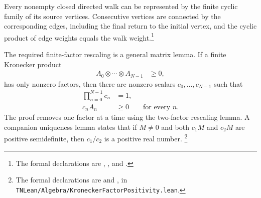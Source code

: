 \documentclass{article}
\begin{document}
Every nonempty closed directed walk can be represented by the finite cyclic
family of its source vertices. Consecutive vertices are connected by the
corresponding edges, including the final return to the initial vertex, and the
cyclic product of edge weights equals the walk weight.\footnote{The formal
declarations are
,
, and
.}

The required finite-factor rescaling is a general matrix lemma. If a finite
Kronecker product
\begin{align}
    A_0\otimes\cdots\otimes A_{N-1}
        &\geq 0,
    \label{eq:cpgsv17_mpdo_sal_zcl_eta_local_structure_positive_finite_kronecker}
\end{align}
has only nonzero factors, then there are nonzero scalars
$c_0,\ldots,c_{N-1}$ such that
\begin{align}
    \prod_{n=0}^{N-1}c_n
        &=1,
    \label{eq:cpgsv17_mpdo_sal_zcl_eta_local_structure_rescaling_product_one}\\
    c_nA_n
        &\geq 0
        \qquad\text{for every }n.
    \label{eq:cpgsv17_mpdo_sal_zcl_eta_local_structure_rescaled_factors_positive}
\end{align}
The proof removes one factor at a time using the two-factor rescaling lemma.
A companion uniqueness lemma states that if $M\neq 0$ and both $c_1M$ and
$c_2M$ are positive semidefinite, then $c_1/c_2$ is a positive real number.
\footnote{The formal declarations are
 and
, in
\texttt{TNLean/Algebra/KroneckerFactorPositivity.lean}.}
\end{document}
